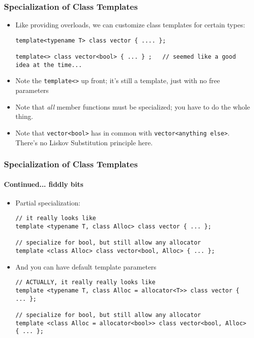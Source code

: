 \begin{frame}[fragile,t]
\frametitle{Specialization of Class Templates}
\begin{itemize}[<+->]
\item Like providing overloads, we can customize class templates for certain types:
{\scriptsize
\begin{verbatim}
template<typename T> class vector { .... };

template<> class vector<bool> { ... } ;   // seemed like a good idea at the time...
\end{verbatim}
}
\item Note the \texttt{template<>} up front; it's still a template, just with no free parameters
\item Note that \emph{all} member functions must be specialized; you have to do the whole thing.
\item Note that \texttt{vector<bool>} has  in common with \texttt{vector<anything else>}.  There's no Liskov Substitution principle here.
\end{itemize}
\end{frame}


\begin{frame}[fragile,t]
\frametitle{Specialization of Class Templates}
\framesubtitle{Continued... fiddly bits}
\begin{itemize}[<+->]
\item Partial specialization:
{\scriptsize
\begin{verbatim}
// it really looks like
template <typename T, class Alloc> class vector { ... };

// specialize for bool, but still allow any allocator
template <class Alloc> class vector<bool, Alloc> { ... };
\end{verbatim}
}
\item And you can have default template parameters
{\scriptsize
\begin{verbatim}
// ACTUALLY, it really really looks like
template <typename T, class Alloc = allocator<T>> class vector { ... };

// specialize for bool, but still allow any allocator
template <class Alloc = allocator<bool>> class vector<bool, Alloc> { ... };
\end{verbatim}
}

\end{itemize}
\end{frame}

